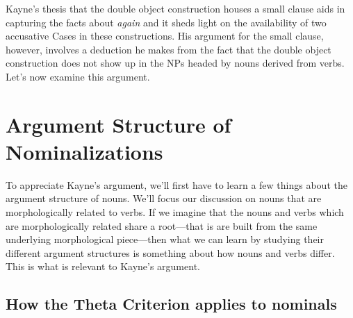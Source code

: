 Kayne's thesis that the double object construction houses a small clause aids in capturing the facts about \emph{again} and it sheds light on the availability of two accusative Cases in these constructions. His argument for the small clause, however, involves a deduction he makes from the fact that the double object construction does not show up in the NPs headed by nouns derived from verbs. Let's now examine this argument.

\section{Argument Structure of Nominalizations} 
\label{sec:nominalizations}

To appreciate Kayne's argument, we'll first have to learn a few things about the argument structure of nouns. We'll focus our discussion on nouns that are morphologically related to verbs. If we imagine that the nouns and verbs which are morphologically related share a root---that is are built from the same underlying morphological piece---then what we can learn by studying their different argument structures is something about how nouns and verbs differ. This is what is relevant to Kayne's argument.

\subsection{How the Theta Criterion applies to nominals} 
\label{sub:nominaltheta}

